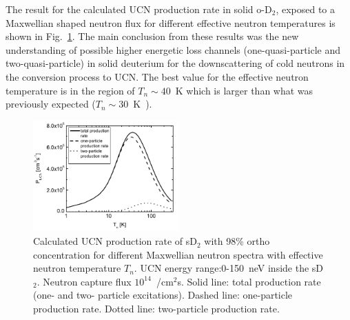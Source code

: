 
The result for the calculated UCN production rate in solid o-D$_2$,
exposed to a Maxwellian shaped neutron flux for different effective
neutron temperatures is shown in
Fig.~\ref{fig:sD2_production_rate}. The main conclusion from these
results was the new understanding of possible higher energetic loss
channels (one-quasi-particle and two-quasi-particle) in solid
deuterium for the downscattering of cold neutrons in the conversion
process to UCN. The best value for the effective neutron temperature
is in the region of $T_n \sim 40$~K which is larger than what was
previously expected ($T_n \sim 30$~K~\cite{Yu1985}).



\begin{figure}[h!]
\begin{center}
   \includegraphics[width=0.5\textwidth]{Frei2010_P.PNG} \caption{\cite{Frei2010}
    Calculated UCN production rate of sD$_2$ with 98\% ortho
    concentration for different Maxwellian neutron spectra with
    effective neutron temperature $T_n$. UCN energy range:0-150~neV
    inside the sD$_2$. Neutron capture flux $10^{14}$~/cm$^2$s. Solid
    line: total production rate (one- and two- particle
    excitations). Dashed line: one-particle production rate. Dotted
    line: two-particle production rate.}
    \label{fig:sD2_production_rate}
    \end{center}
\end{figure} 







